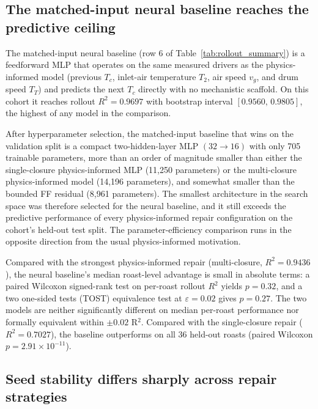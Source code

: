 \documentclass[fleqn,10pt]{wlscirep}
\begin{document}
\subsection*{The matched-input neural baseline reaches the predictive ceiling}

The matched-input neural baseline (row 6 of Table~\ref{tab:rollout_summary}) is a feedforward MLP that operates on the same measured drivers as the physics-informed model (previous $T_c$, inlet-air temperature $T_2$, air speed $v_g$, and drum speed $T_T$) and predicts the next $T_c$ directly with no mechanistic scaffold. On this cohort it reaches rollout $R^2 = 0.9697$ with bootstrap interval $[0.9560,\,0.9805]$, the highest of any model in the comparison.

After hyperparameter selection, the matched-input baseline that wins on the validation split is a compact two-hidden-layer MLP $(32 \rightarrow 16)$ with only 705 trainable parameters, more than an order of magnitude smaller than either the single-closure physics-informed MLP (11{,}250 parameters) or the multi-closure physics-informed model (14{,}196 parameters), and somewhat smaller than the bounded FF residual (8{,}961 parameters). The smallest architecture in the search space was therefore selected for the neural baseline, and it still exceeds the predictive performance of every physics-informed repair configuration on the cohort's held-out test split. The parameter-efficiency comparison runs in the opposite direction from the usual physics-informed motivation.

Compared with the strongest physics-informed repair (multi-closure, $R^2 = 0.9436$), the neural baseline's median roast-level advantage is small in absolute terms: a paired Wilcoxon signed-rank test on per-roast rollout $R^2$ yields $p = 0.32$, and a two one-sided tests (TOST) equivalence test at $\varepsilon = 0.02$ gives $p = 0.27$. The two models are neither significantly different on median per-roast performance nor formally equivalent within $\pm 0.02$ R$^2$. Compared with the single-closure repair ($R^2 = 0.7027$), the baseline outperforms on all 36 held-out roasts (paired Wilcoxon $p = 2.91 \times 10^{-11}$).

\subsection*{Seed stability differs sharply across repair strategies}
\end{document}
